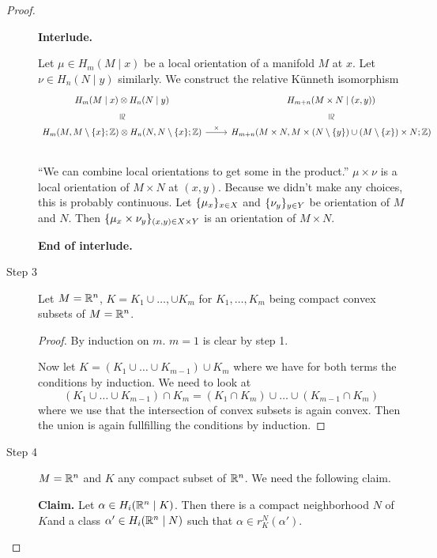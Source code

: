\documentclass[language=english]{TemplateLecture}
\begin{document}
\begin{proof}
\begin{description}

\textbf{Interlude.}

\begin{construction}
    Let \(\mu \in H_m(M \mid x)\) be a local orientation of a manifold \(M\) at \(x\). Let \(\nu \in H_n(N\mid y)\) similarly. We construct the relative Künneth isomorphism 
    \[\begin{tikzcd}
        H_m(M \mid x) \otimes H_n(N \mid y) \ar[d, "\cong", phantom, sloped] & H_{m+n}(M \times N \mid (x,y)) \ar[d, "\cong", phantom, sloped] \\
        H_m(M, M \setminus \set x; \IZ) \otimes H_n(N, N \setminus \set x; \IZ) \ar[r, "\times"] & H_{m+n}(M\times N, M \times (N\setminus \set y) \cup (M\setminus \set x)\times N; \IZ) \\
    \end{tikzcd}\]
    \enquote{We can combine local orientations to get some in the product.}
    \(\mu \times \nu\) is a local orientation of \(M \times N\) at \((x,y)\). Because we didn't make any choices, this is probably continuous. Let \(\{\mu_x\}_{x \in X}\) and \(\{\nu_y\}_{y \in Y}\) be orientation of \(M\) and \(N\). Then \(\{\mu_x \times \nu_y\}_{(x,y) \in X \times Y}\) is an orientation of \(M \times N\).
\end{construction}

\textbf{End of interlude.}

    \item[Step 3] Let \(M = \mathbb{R}^n\), \(K = K_1 \cup \dots, \cup K_m\) for \(K_1, \dots, K_m\) being compact convex subsets of \(M = \mathbb{R}^n\).
    
    \begin{proof}
        By induction on \(m\). \(m = 1\) is clear by step 1.

        Now let \(K = (K_1 \cup \dots \cup K_{m-1}) \cup K_m\) where we have for both terms the conditions by induction. We need to look at
        \[(K_1 \cup \dots \cup K_{m-1}) \cap K_m = (K_1 \cap K_m) \cup \dots \cup (K_{m-1} \cap K_m)\]
        where we use that the intersection of convex subsets is again convex. Then the union is again fullfilling the conditions by induction.
    \end{proof}

    \item[Step 4] \(M = \mathbb{R}^n\) and \(K\) any compact subset of \(\mathbb{R}^n\). We need the following claim.
    
    \textbf{Claim.} Let \(\alpha\in H_i(\mathbb{R}^n \mid K)\). Then there is a compact neighborhood \(N\) of \(K\)and a class \(\alpha'\in H_i(\mathbb{R}^n \mid N)\) such that \(\alpha \in r_K^N(\alpha')\).


\end{description}
\end{proof}
\end{document}
